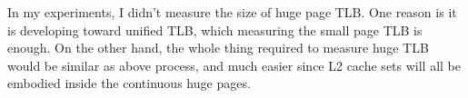 In my experiments, I didn't measure the size of huge page TLB. One reason is it
is developing toward unified TLB, which measuring the small page TLB is enough.
On the other hand, the whole thing required to measure huge TLB would be similar
as above process, and much easier since L2 cache sets will all be embodied inside
the continuous huge pages.

